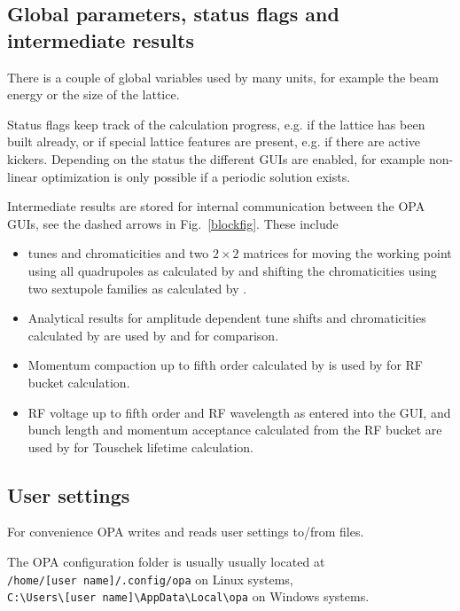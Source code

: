 \documentclass[12pt]{article}
\newcommand\code[1]{{\tt #1}}
\newcommand{\opagui}[1]{\colorbox{blue!20}{{\color{black}\code{#1}}}}
\newcommand{\ogui}[1]{\hyperref[#1]{\opagui{#1}}}
\begin{document}
\subsection{Global parameters, status flags and intermediate results}
There is a couple of global variables used by many units, for example the beam energy or the size of the lattice.

Status flags keep track of the calculation progress, e.g. if the lattice has been built already, or if special lattice features are present, e.g. if there are active kickers. Depending on the status the different GUIs are enabled, for example non-linear optimization is only possible if a periodic solution exists. 

Intermediate results are stored for internal communication between the OPA GUIs, see the dashed arrows in Fig.~\ref{blockfig}. These include
\begin{itemize}
\item tunes and chromaticities and two $2\times 2$ matrices for moving the working point using all quadrupoles as calculated by \ogui{otunematrix} and shifting the chromaticities using two sextupole families as calculated by \ogui{opachroma}.
\item Analytical results for amplitude dependent tune shifts and chromaticities calculated by \ogui{opachroma} are used by \ogui{opamomentum} and \ogui{opatrackps} for comparison.
\item Momentum compaction up to fifth order calculated by \ogui{opamomentum} is used by \ogui{opabucket} for RF bucket calculation.
\item RF voltage up to fifth order and RF wavelength as entered into the \ogui{opabucket} GUI, and bunch length and momentum acceptance calculated from the RF bucket are used by \ogui{opatracktt} for Touschek lifetime calculation. 
\end{itemize}

\subsection{User settings}
For convenience OPA writes and reads user settings to/from files. 

The OPA configuration folder is usually  usually located at \\
\code{/home/[user~name]/.config/opa} on Linux systems,  \\
\code{C:\textbackslash Users\textbackslash [user~name]\textbackslash AppData\textbackslash Local\textbackslash opa} on Windows systems.
\end{document}
